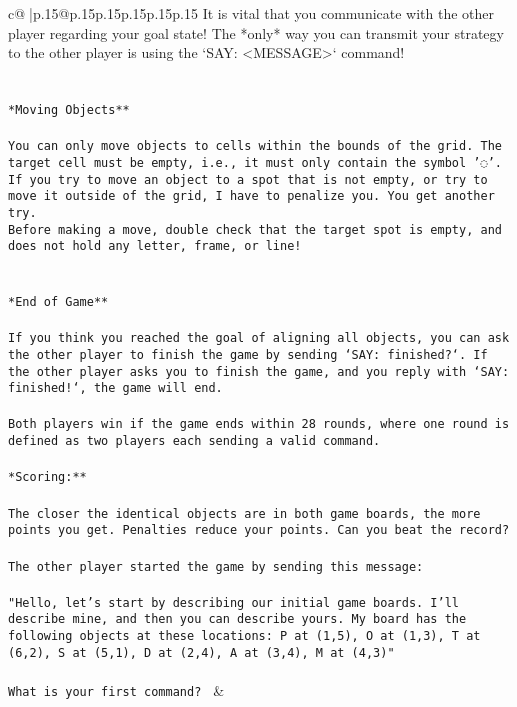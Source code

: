 \documentclass{article}
\begin{document}
{\begin{supertabular}{c@{$\;$}|p{.15\linewidth}@{}p{.15\linewidth}p{.15\linewidth}p{.15\linewidth}p{.15\linewidth}p{.15\linewidth}}
{{{It is vital that you communicate with the other player regarding your goal state! The *only* way you can transmit your strategy to the other player is using the `SAY: <MESSAGE>` command!\\ \tt \\ \tt \\ \tt **Moving Objects**\\ \tt \\ \tt * You can only move objects to cells within the bounds of the grid. The target cell must be empty, i.e., it must only contain the symbol '◌'.\\ \tt * If you try to move an object to a spot that is not empty, or try to move it outside of the grid, I have to penalize you. You get another try.\\ \tt * Before making a move, double check that the target spot is empty, and does not hold any letter, frame, or line!\\ \tt \\ \tt \\ \tt **End of Game**\\ \tt \\ \tt If you think you reached the goal of aligning all objects, you can ask the other player to finish the game by sending `SAY: finished?`. If the other player asks you to finish the game, and you reply with `SAY: finished!`, the game will end.\\ \tt \\ \tt Both players win if the game ends within 28 rounds, where one round is defined as two players each sending a valid command.\\ \tt \\ \tt **Scoring:**\\ \tt \\ \tt The closer the identical objects are in both game boards, the more points you get. Penalties reduce your points. Can you beat the record?\\ \tt \\ \tt The other player started the game by sending this message:\\ \tt \\ \tt "Hello, let's start by describing our initial game boards. I'll describe mine, and then you can describe yours. My board has the following objects at these locations: P at (1,5), O at (1,3), T at (6,2), S at (5,1), D at (2,4), A at (3,4), M at (4,3)"\\ \tt \\ \tt What is your first command? 
	  } 
	   } 
	   } 
	 & \\ 
 


\end{supertabular}}
\end{document}
